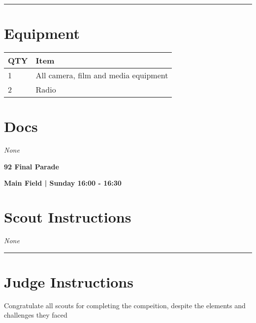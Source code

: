 \documentclass[10pt]{article}
\newcommand{\newtitle}[1]{\begin{center}{\Huge\bfseries #1 }\\ \vspace{5mm}\end{center}}
\newcommand{\newsubtitle}[1]{\begin{center}{\color{grey}\Large\bfseries #1 }\\ \vspace{5mm}\end{center}}
\begin{document}
			\vspace{0.5cm}
	\hrule
	\vspace{0.5cm}

	\begin{multicols}{2}

		\section*{\faWrench \: Equipment}

		
	\begin{center}
			\begin{tabular}{p{2cm}p{4cm}}


				\textbf{QTY} & \textbf{Item} \\\toprule
												1&All camera, film and media equipment\\\midrule
												2&Radio\\\midrule
								\end{tabular}

			\end{center}

		
		\vfill\null
		\columnbreak

			\section*{\faFile \: Docs}
		 	\textit{None}
	

		\vfill\null

		\end{multicols}



	\vspace{1cm}


	\clearpage
		\newtitle{92 Final Parade }
	\newsubtitle{Main Field | Sunday 16:00 - 16:30}
		\setcounter{section}{91}
	\section*{Scout Instructions}
		\textit{None}
	
	\vspace{0.5cm}
	\hrule
	\vspace{0.5cm}

		\section*{Judge Instructions}
		Congratulate all scouts for completing the compeition, despite the elements and challenges they faced
\end{document}

